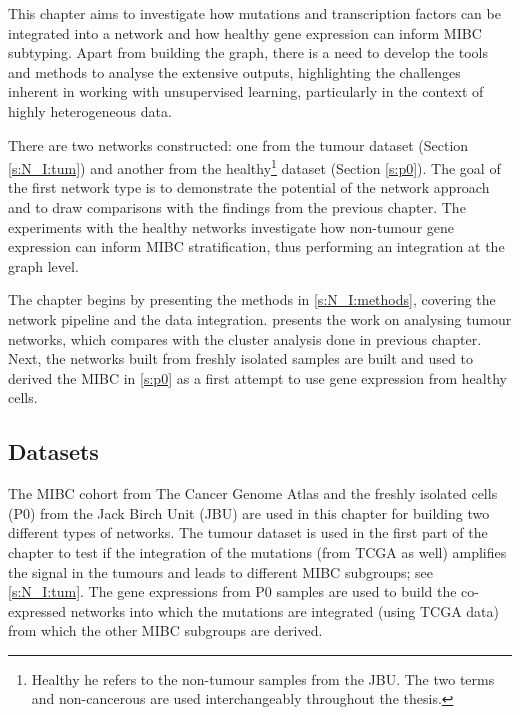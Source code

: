 This chapter aims to investigate how mutations and transcription factors can be integrated into a network and how healthy gene expression can inform MIBC subtyping. Apart from building the graph, there is a need to develop the tools and methods to analyse the extensive outputs, highlighting the challenges inherent in working with unsupervised learning, particularly in the context of highly heterogeneous data.

There are two networks constructed: one from the tumour dataset (Section \ref{s:N_I:tum}) and another from the healthy\footnote{Healthy he refers to the non-tumour samples from the JBU. The two terms and non-cancerous are used interchangeably throughout the thesis.} dataset (Section \ref{s:p0}). The goal of the first network type is to demonstrate the potential of the network approach and to draw comparisons with the findings from the previous chapter. The experiments with the healthy networks investigate how non-tumour gene expression can inform MIBC stratification, thus performing an integration at the graph level.

The chapter begins by presenting the methods in \cref{s:N_I:methods}, covering the network pipeline and the data integration.  presents the work on analysing tumour networks, which compares with the cluster analysis done in previous chapter. Next, the networks built from freshly isolated samples are built and used to derived the MIBC in \cref{s:p0} as a first attempt to use gene expression from healthy cells.




\subsection*{Datasets}

The MIBC cohort from The Cancer Genome Atlas \citep{Tcga2018-sj} and the freshly isolated cells (P0) from the Jack Birch Unit (JBU) are used in this chapter for building two different types of networks. The tumour dataset is used in the first part of the chapter to test if the integration of the mutations (from TCGA as well) amplifies the signal in the tumours and leads to different MIBC subgroups; see \cref{s:N_I:tum}. The gene expressions from P0 samples are used to build the co-expressed networks into which the mutations are integrated (using TCGA data) from which the other MIBC subgroups are derived.

